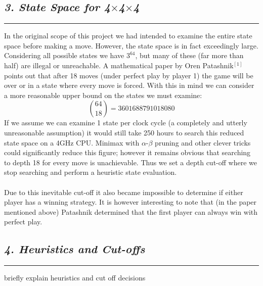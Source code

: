 \documentclass[10pt]{article}
\begin{document}
\begin{multicols}{2}
\subsection*{\emph { \textmd{3. State Space for 4$\times$4$\times$4}}}
\hrule
\vspace{0.4cm}

In the original scope of this project we had intended to examine the entire state space
before making a move. However, the state space is in fact exceedingly large. Considering all
possible states we have $3^{64}$, but many of these (far more than half) are illegal or unreachable.
A mathematical paper by Oren Patashnik$^{[1]}$ points out that after 18 moves (under perfect play by player 1)
the game will be over or in a state where every move is forced. With this in mind we can 
consider a more reasonable upper bound on the states we must examine:
 \[\binom{64}{18} = 3601688791018080\]
If we assume we can examine 1 state per clock cycle (a completely and utterly unreasonable assumption) it would
still take 250 hours to search this reduced state space on a 4GHz CPU. Minimax with $\alpha$-$\beta$ pruning
and other clever tricks could significantly reduce this figure; however it remains obvious that
searching to depth 18 for every move is unachievable. Thus we set a depth cut-off where we stop
searching and perform a heuristic state evaluation.\\\\
Due to this inevitable cut-off it also became impossible to determine if either
player has a winning strategy. It is however interesting to note that (in the paper
mentioned above) Patashnik determined that the first player can always win with perfect play. 

\subsection*{\emph { \textmd{4. Heuristics and Cut-offs}}}
\hrule
\vspace{0.4cm}
briefly explain heuristics and cut off decisions\\




\end{multicols}
\end{document}
